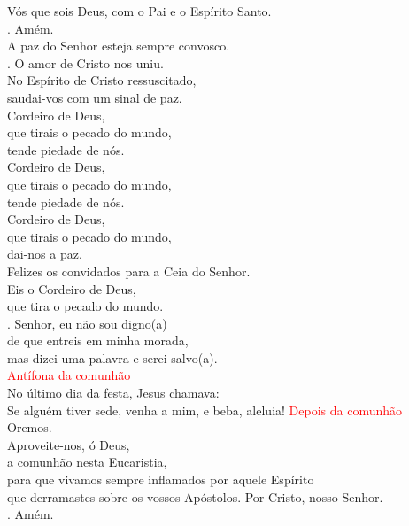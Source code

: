 \documentclass{book}
\begin{document}
\begin{flushleft}
    Vós que sois Deus, com o Pai e o Espírito Santo.
    \vspace{.1cm} \\
    {\color{red} \Rbar.} Amém.
    \vspace{.1cm} \\
    A paz do Senhor esteja sempre convosco.
    \vspace{.1cm} \\
    {\color{red} \Rbar.} O amor de Cristo nos uniu.
    \vspace{.1cm} \\
    No Espírito de Cristo ressuscitado, \\
    saudai-vos com um sinal de paz.
    \vspace{.1cm} \\
    Cordeiro de Deus, \\
    que tirais o pecado do mundo, \\
    tende piedade de nós. \\
    Cordeiro de Deus, \\
    que tirais o pecado do mundo, \\
    tende piedade de nós. \\
    Cordeiro de Deus, \\
    que tirais o pecado do mundo, \\
    dai-nos a paz.
    \vspace{.1cm} \\
    Felizes os convidados para a Ceia do Senhor.
    \vspace{.1cm} \\
    Eis o Cordeiro de Deus, \\
    que tira o pecado do mundo.
    \vspace{.1cm} \\
    {\color{red} \Rbar.} Senhor, eu não sou digno{\color{red}(}a{\color{red})} \\
    de que entreis em minha morada, \\
    mas dizei uma palavra e serei salvo{\color{red}(}a{\color{red})}.
    \vspace{.1cm} \\
    \textcolor{red}{Antífona da comunhão}
    \vspace{.1cm} \\
    No último dia da festa, Jesus chamava: \\
    Se alguém tiver sede, venha a mim, e beba, aleluia!
    \newpage
    \textcolor{red}{Depois da comunhão}
    \vspace{.1cm} \\
    Oremos.
    \vspace{.1cm} \\
    Aproveite-nos, ó Deus, \\
    a comunhão nesta Eucaristia, \\
    para que vivamos sempre inflamados por aquele Espírito \\
    que derramastes sobre os vossos Apóstolos.
    Por Cristo, nosso Senhor.
    \vspace{.1cm} \\
    {\color{red} \Rbar.} Amém.
\end{flushleft}
\end{document}
